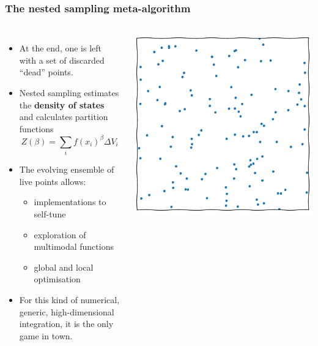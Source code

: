 \documentclass[aspectratio=169]{beamer}
\begin{document}
\begin{frame}
    \frametitle{The nested sampling meta-algorithm}
    \begin{columns}
        \begin{itemize}
            \item At the end, one is left with a set of discarded ``dead'' points.
            \item Nested sampling estimates the \textbf{density of states} and calculates partition functions
                \[Z(\beta) = \sum_i f(x_i)^\beta \Delta V_i\]
            \item The evolving ensemble of live points allows:
                \begin{itemize}
                    \item implementations to self-tune
                    \item exploration of multimodal functions
                    \item global and local optimisation
                \end{itemize}
            \item For this kind of numerical, generic, high-dimensional integration, it is the only game in town.
        \end{itemize}
        \includegraphics[width=\textwidth,page=14]{figures/himmelblau}%
    \end{columns}
\end{frame}
\end{document}
